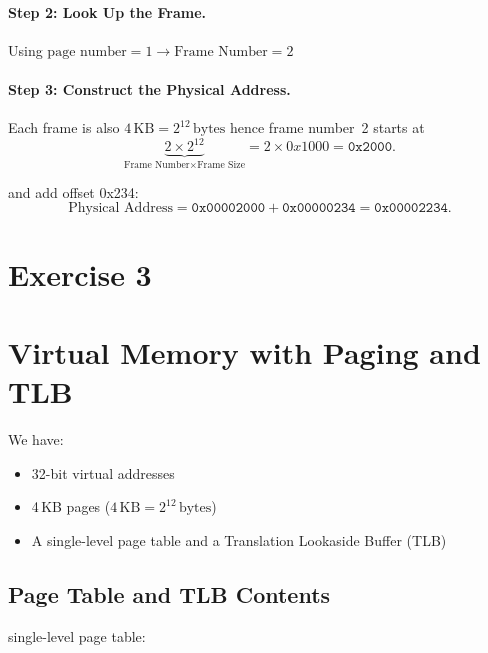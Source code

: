 \documentclass{article}
\newcommand{\exercise}[1]{
    \section*{Exercise #1}
    \markboth{Exercise #1}{}
}
\begin{document}
\paragraph{Step 2: Look Up the Frame.}

Using \(\text{page number} = 1 \longrightarrow \text{Frame Number} = 2\)


\paragraph{Step 3: Construct the Physical Address.}

Each frame is also \(4\,\text{KB} = 2^{12}\,\text{bytes}\) hence frame number~2 starts at
\[
\underbrace{2 \times 2^{12}}_{\text{Frame Number} \times \text{Frame Size}}
= 2 \times 0x1000 
= \texttt{0x2000}.
\]

and add offset 0x234:
\[
\text{Physical Address} = \texttt{0x00002000} + \texttt{0x00000234} = \texttt{0x00002234}.
\]






\newpage
\exercise{3}


\section*{Virtual Memory with Paging and TLB}

We have:
\begin{itemize}
  \item 32-bit virtual addresses
  \item 4\,KB pages (\(4\,\text{KB} = 2^{12}\,\text{bytes}\))
  \item A single-level page table and a Translation Lookaside Buffer (TLB)
\end{itemize}

\subsection*{Page Table and TLB Contents}

single-level page table:\newline
\end{document}
